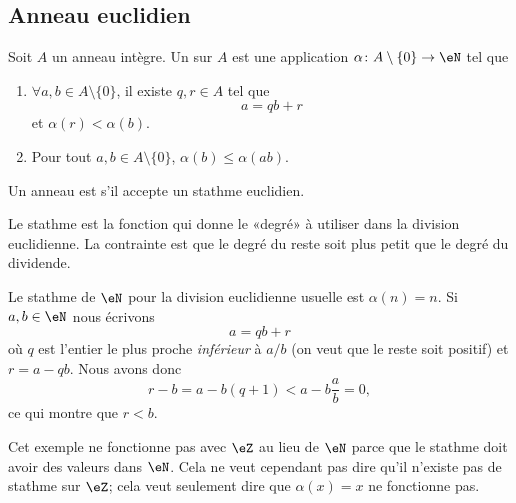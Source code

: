 \subsection{Anneau euclidien}

\begin{definition} \label{DefAXitWRL}
    Soit \( A\) un anneau intègre. Un  sur \( A\) est une application \( \alpha\colon A\setminus\{ 0 \}\to \eN\) tel que
    \begin{enumerate}
        \item       \label{ITEMooLVJAooLpjgEz}
            \( \forall a,b\in A\setminus\{ 0 \}\), il existe \( q,r\in A\) tel que
            \begin{equation}
                a=qb+r
            \end{equation}
            et \( \alpha(r)<\alpha(b)\).
        \item
            Pour tout \( a,b\in A\setminus\{ 0 \}\), \( \alpha(b)\leq \alpha(ab)\).
    \end{enumerate}
    Un anneau est  s'il accepte un stathme euclidien.
\end{definition}
Le stathme est la fonction qui donne le «degré» à utiliser dans la division euclidienne. La contrainte est que le degré du reste soit plus petit que le degré du dividende.

\begin{example} \label{ExwqlCwvV}
    Le stathme de \( \eN\) pour la division euclidienne usuelle est \( \alpha(n)=n\). Si \( a,b\in \eN\) nous écrivons
    \begin{equation}
        a=qb+r
    \end{equation}
    où \( q\) est l'entier le plus proche \emph{inférieur} à \( a/b\) (on veut que le reste soit positif) et \( r=a-qb\). Nous avons donc
    \begin{equation}
        r-b=a-b(q+1)<a-b\frac{ a }{ b }=0,
    \end{equation}
    ce qui montre que \( r<b\).
\end{example}

Cet exemple ne fonctionne pas avec \( \eZ\) au lieu de \( \eN\) parce que le stathme doit avoir des valeurs dans \( \eN\). Cela ne veut cependant pas dire qu'il n'existe pas de stathme sur \( \eZ\); cela veut seulement dire que \( \alpha(x)=x\) ne fonctionne pas.

